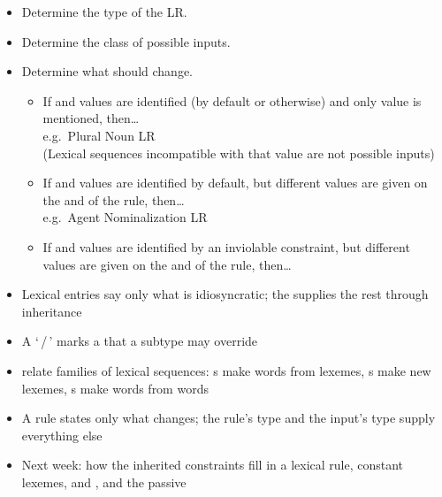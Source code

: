 \documentclass[a4paper,landscape,headrule,footrule]{foils}
\begin{document}
\begin{itemize}
\item Determine the type of the LR.
\item Determine the class of possible inputs.
\item Determine what should change.
  \begin{small}
  \begin{itemize}
  \item If  and  values are identified (by default or otherwise) and
    only  value is mentioned, then\ldots
    \\   e.g.\ Plural Noun LR
    \\[1ex] (Lexical sequences incompatible with that value are not possible inputs)
  \item If  and  values are identified by default, but different values
    are given on the  and  of the rule, then\ldots
    \\   e.g.\ Agent Nominalization LR
  \item If  and  values are identified by an inviolable constraint, but
    different values are given on the  and  of the rule, then\ldots
    \\ 
  \end{itemize}
  \end{small}
\end{itemize}


\begin{itemize}
\item Lexical entries say only what is idiosyncratic; the
   supplies the rest through inheritance
\item A `\,/\,' marks a  that a subtype may override
\item {} relate families of lexical sequences:
  s make words from lexemes, s make new
  lexemes, s make words from words
\item A rule states only what changes; the rule's type and the
  input's type supply everything else
\item Next week: how the inherited constraints fill in a lexical rule,
  constant lexemes,  and , and the passive
\end{itemize}
\end{document}
